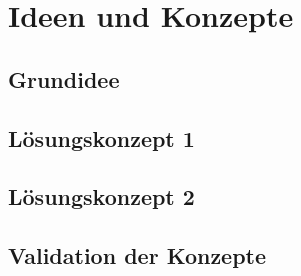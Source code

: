 \chapter{Ideen und Konzepte}

\section{Grundidee}

\section{Lösungskonzept 1}



\section{Lösungskonzept 2}



\section{Validation der Konzepte}

